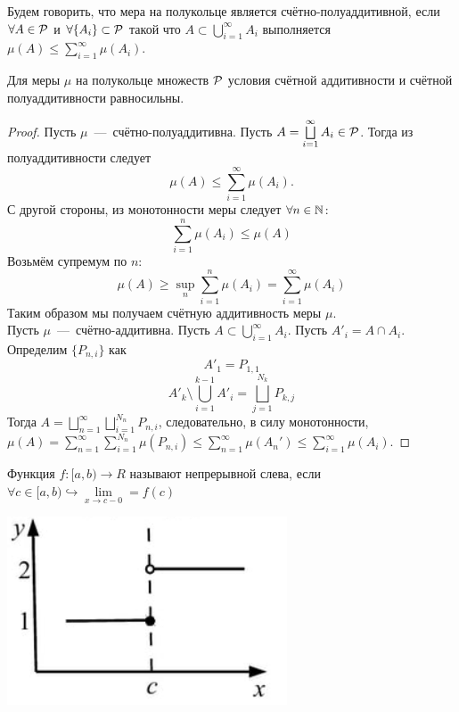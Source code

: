 \begin{definition}
Будем говорить, что мера на полукольце является счётно-полуаддитивной, если $\forall A \in \mathcal{P}$ и $\forall \{A_i\} \subset \mathcal{P}$ такой что $A \subset \bigcup\limits_{i = 1}^{\infty} A_i$ выполняется $\mu(A) \leq \sum\limits_{i = 1}^{\infty} \mu(A_i)$.
\end{definition}
\begin{theorem}
Для меры $\mu$ на полукольце множеств $\mathcal{P}$ условия счётной аддитивности и счётной полуаддитивности равносильны.
\end{theorem}
\begin{proof}
Пусть $\mu$~---~счётно-полуаддитивна. Пусть $A = \bigsqcup\limits_{ i =1}^{\infty} A_i \in \mathcal{P}$. Тогда из полуаддитивности следует \[\mu(A) \leq \sum\limits_{i = 1}^{\infty} \mu(A_i).\]
С другой стороны, из монотонности меры следует $\forall n \in \mathbb{N}$: \[\sum\limits_{i = 1}^n \mu(A_i) \leq \mu(A)\]
Возьмём супремум по $n$: \[\mu(A) \geq \sup_n\sum\limits_{i = 1}^n \mu(A_i) = \sum\limits_{i = 1}^{\infty} \mu(A_i)\]
Таким образом мы получаем счётную аддитивность меры $\mu$. \\
Пусть $\mu$~---~счётно-аддитивна. Пусть $A \subset \bigcup\limits_{i = 1}^{\infty} A_i$. Пусть $A'_i = A \cap A_i$. Определим $\{P_{n, i}\}$ как \[A'_1 = P_{1, 1}\]\[A'_k \setminus \bigcup\limits_{i = 1}^{k - 1} A'_i = \bigsqcup\limits_{j = 1}^{N_k} P_{k,j}\] Тогда $A = \bigsqcup\limits_{n = 1}^{\infty}\bigsqcup\limits_{i = 1}^{N_n} P_{n, i}$, следовательно, в силу монотонности, $\mu(A) = \sum\limits_{n = 1}^{\infty}\sum\limits_{i = 1}^{N_n} \mu(P_{n, i}) \leq \sum\limits_{n = 1}^{\infty} \mu(A_n') \leq \sum\limits_{i = 1}^{\infty} \mu(A_i)$.
\end{proof}

\noindent 
\begin{minipage}{0.7\textwidth}
\begin{reminder}
    Функция $f: [a, b) \to R$ называют непрерывной слева, если $\forall c \in [a, b) \hookrightarrow \lim\limits_{x\to c-0} = f(c)$
\end{reminder}
\end{minipage}
\begin{minipage}{0.3\textwidth}
\includegraphics[width=\textwidth]{images/neprer_sleva.png}
\end{minipage}


